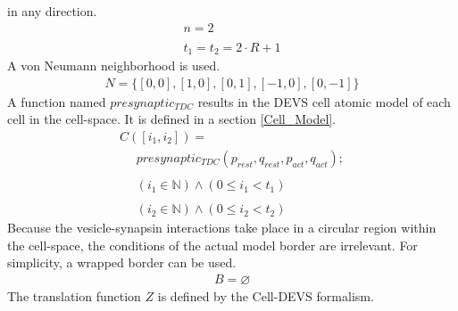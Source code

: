 \documentclass{acm_proc_article-sp}
\begin{document}
in any direction.
\begin{displaymath} \begin{array}{l}
n = 2 \\
\\
t_1 = t_2 = 2 \cdot R + 1
\end{array} \end{displaymath}
A von Neumann neighborhood is used.
\begin{displaymath} \begin{array}{l}
N = \{[0, 0], [1, 0], [0, 1], [-1, 0], [0, -1]\}
\end{array} \end{displaymath}
A function named $presynaptic_{TDC}$ results in the DEVS cell 
atomic model of each cell in the cell-space.  It is defined in a 
section \ref{Cell_Model}.
\begin{displaymath} \begin{array}{l}
C([i_1, i_2]) = \\
\hspace{16pt} presynaptic_{TDC}(p_{rest}, q_{rest}, p_{act}, q_{act}); \\
\\
\hspace{16pt} (i_1 \in \mathbb{N}) \wedge (0 \le i_1 < t_1) \\
\\
\hspace{16pt} (i_2 \in \mathbb{N}) \wedge (0 \le i_2 < t_2)
\end{array} \end{displaymath}
Because the vesicle-synapsin interactions take place in a circular 
region within the cell-space, the conditions of the actual model 
border are irrelevant.  For simplicity, a wrapped border can be used.
\begin{displaymath} \begin{array}{l}
B = \varnothing
\end{array} \end{displaymath}
The translation function $Z$ is defined by the Cell-DEVS formalism.
\end{document}
